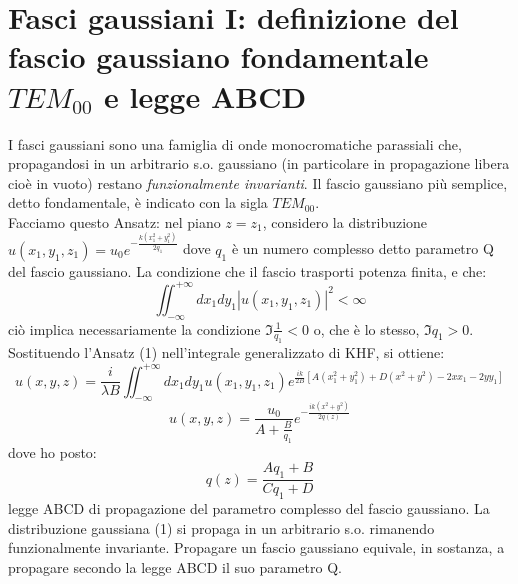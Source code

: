 \documentclass{book}
\def \l {\lambda}
\theoremstyle{remark}
\begin{document}
\section{Fasci gaussiani I: definizione del fascio gaussiano fondamentale $TEM_{00}$ e legge ABCD}
I fasci gaussiani sono una famiglia di onde monocromatiche parassiali che, propagandosi in un arbitrario s.o. gaussiano (in particolare in propagazione libera cioè in vuoto) restano \textit{funzionalmente invarianti}. Il fascio gaussiano più semplice, detto fondamentale, è indicato con la sigla $TEM_{00}$.\\
Facciamo questo Ansatz:
nel piano $z = z_1$, considero la distribuzione $u(x_1,y_1,z_1) = u_0 e^{-\frac{k(x_1^2 + y_1^2)}{2 q_1}}$ dove $q_1$ è un numero complesso detto parametro Q del fascio gaussiano. La condizione che il fascio trasporti potenza finita, e che:
\begin{equation*}
\iint_{-\infty}^{+\infty} dx_1 dy_1 |u(x_1,y_1,z_1)|^2 < \infty
\end{equation*}
ciò implica necessariamente la condizione $\Im{\frac{1}{q_1}} < 0$ o, che è lo stesso, $\Im{q_1} > 0$. Sostituendo l'Ansatz (1) nell'integrale generalizzato di KHF, si ottiene:
\begin{equation*}
u(x,y,z) = \frac{i}{\l B} \iint_{-\infty}^{+\infty} dx_1 dy_1 u(x_1,y_1,z_1) e^{\frac{ik}{2B} [A (x_1^2 + y_1^2) + D(x^2 + y^2) -2xx_1 - 2yy_1]}
\end{equation*}
\begin{equation*}
u(x,y,z) = \frac{u_0}{A + \frac{B}{q_1}} e^{-\frac{ik(x^2 + y^2)}{2q(z)}}
\end{equation*}
dove ho posto:
\begin{equation*}
q(z) = \frac{Aq_1 + B}{Cq_1 + D}
\end{equation*}
legge ABCD di propagazione del parametro complesso del fascio gaussiano.
La distribuzione gaussiana (1) si propaga in un arbitrario s.o. rimanendo funzionalmente invariante. Propagare un fascio gaussiano equivale, in sostanza, a propagare secondo la legge ABCD il suo parametro Q.\\
\end{document}
